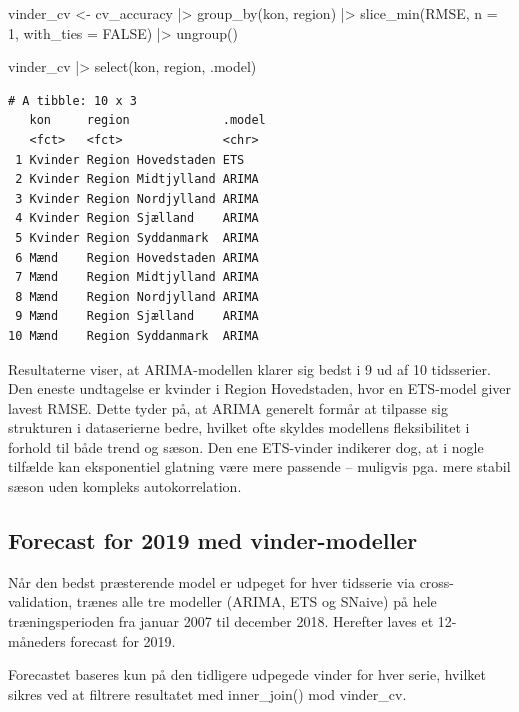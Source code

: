 \documentclass[
]{article}
\newenvironment{Shaded}{\begin{snugshade}}{\end{snugshade}}
\newcommand{\AttributeTok}[1]{\textcolor[rgb]{0.40,0.45,0.13}{#1}}
\newcommand{\ConstantTok}[1]{\textcolor[rgb]{0.56,0.35,0.01}{#1}}
\newcommand{\DecValTok}[1]{\textcolor[rgb]{0.68,0.00,0.00}{#1}}
\newcommand{\FunctionTok}[1]{\textcolor[rgb]{0.28,0.35,0.67}{#1}}
\newcommand{\NormalTok}[1]{\textcolor[rgb]{0.00,0.23,0.31}{#1}}
\newcommand{\OtherTok}[1]{\textcolor[rgb]{0.00,0.23,0.31}{#1}}
\newcommand{\SpecialCharTok}[1]{\textcolor[rgb]{0.37,0.37,0.37}{#1}}
\begin{document}
\begin{Shaded}
\begin{Highlighting}[]
\NormalTok{vinder\_cv }\OtherTok{\textless{}{-}}\NormalTok{ cv\_accuracy }\SpecialCharTok{|\textgreater{}}
  \FunctionTok{group\_by}\NormalTok{(kon, region) }\SpecialCharTok{|\textgreater{}}
  \FunctionTok{slice\_min}\NormalTok{(RMSE, }\AttributeTok{n =} \DecValTok{1}\NormalTok{, }\AttributeTok{with\_ties =} \ConstantTok{FALSE}\NormalTok{) }\SpecialCharTok{|\textgreater{}}
  \FunctionTok{ungroup}\NormalTok{()}

\NormalTok{vinder\_cv }\SpecialCharTok{|\textgreater{}} \FunctionTok{select}\NormalTok{(kon, region, .model)}
\end{Highlighting}
\end{Shaded}

\begin{verbatim}
# A tibble: 10 x 3
   kon     region             .model
   <fct>   <fct>              <chr> 
 1 Kvinder Region Hovedstaden ETS   
 2 Kvinder Region Midtjylland ARIMA 
 3 Kvinder Region Nordjylland ARIMA 
 4 Kvinder Region Sjælland    ARIMA 
 5 Kvinder Region Syddanmark  ARIMA 
 6 Mænd    Region Hovedstaden ARIMA 
 7 Mænd    Region Midtjylland ARIMA 
 8 Mænd    Region Nordjylland ARIMA 
 9 Mænd    Region Sjælland    ARIMA 
10 Mænd    Region Syddanmark  ARIMA 
\end{verbatim}

Resultaterne viser, at ARIMA-modellen klarer sig bedst i 9 ud af 10
tidsserier. Den eneste undtagelse er kvinder i Region Hovedstaden, hvor
en ETS-model giver lavest RMSE. Dette tyder på, at ARIMA generelt formår
at tilpasse sig strukturen i dataserierne bedre, hvilket ofte skyldes
modellens fleksibilitet i forhold til både trend og sæson. Den ene
ETS-vinder indikerer dog, at i nogle tilfælde kan eksponentiel glatning
være mere passende -- muligvis pga. mere stabil sæson uden kompleks
autokorrelation.

\subsection{Forecast for 2019 med
vinder-modeller}\label{forecast-for-2019-med-vinder-modeller}

Når den bedst præsterende model er udpeget for hver tidsserie via
cross-validation, trænes alle tre modeller (ARIMA, ETS og SNaive) på
hele træningsperioden fra januar 2007 til december 2018. Herefter laves
et 12-måneders forecast for 2019.

Forecastet baseres kun på den tidligere udpegede vinder for hver serie,
hvilket sikres ved at filtrere resultatet med inner\_join() mod
vinder\_cv.
\end{document}
